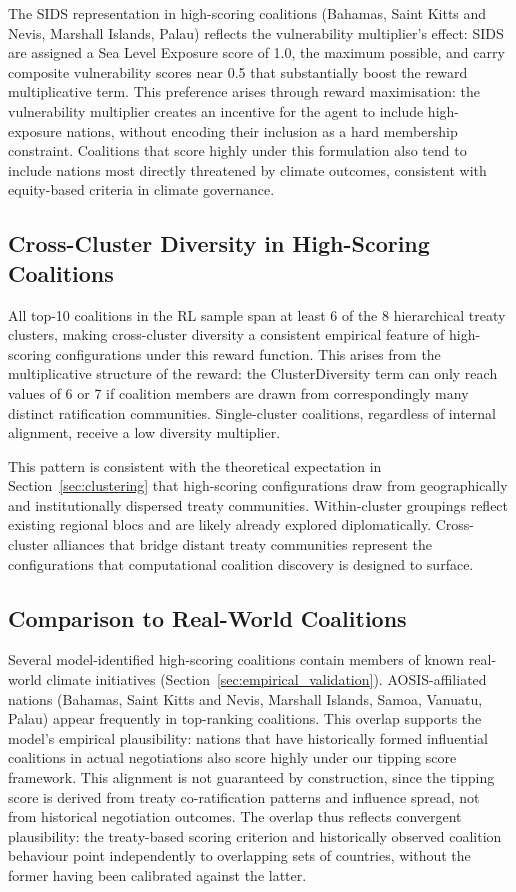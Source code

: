 \documentclass[11pt]{article}
\begin{document}
The SIDS representation in high-scoring coalitions (Bahamas, Saint Kitts and Nevis, Marshall Islands, Palau) reflects the vulnerability multiplier's effect: SIDS are assigned a Sea Level Exposure score of 1.0, the maximum possible, and carry composite vulnerability scores near 0.5 that substantially boost the reward multiplicative term. This preference arises through reward maximisation: the vulnerability multiplier creates an incentive for the agent to include high-exposure nations, without encoding their inclusion as a hard membership constraint. Coalitions that score highly under this formulation also tend to include nations most directly threatened by climate outcomes, consistent with equity-based criteria in climate governance.

\subsection*{Cross-Cluster Diversity in High-Scoring Coalitions}

All top-10 coalitions in the RL sample span at least 6 of the 8 hierarchical treaty clusters, making cross-cluster diversity a consistent empirical feature of high-scoring configurations under this reward function. This arises from the multiplicative structure of the reward: the ClusterDiversity term can only reach values of 6 or 7 if coalition members are drawn from correspondingly many distinct ratification communities. Single-cluster coalitions, regardless of internal alignment, receive a low diversity multiplier.

This pattern is consistent with the theoretical expectation in Section~\ref{sec:clustering} that high-scoring configurations draw from geographically and institutionally dispersed treaty communities. Within-cluster groupings reflect existing regional blocs and are likely already explored diplomatically. Cross-cluster alliances that bridge distant treaty communities represent the configurations that computational coalition discovery is designed to surface.

\subsection*{Comparison to Real-World Coalitions}

Several model-identified high-scoring coalitions contain members of known real-world climate initiatives (Section~\ref{sec:empirical_validation}). AOSIS-affiliated nations (Bahamas, Saint Kitts and Nevis, Marshall Islands, Samoa, Vanuatu, Palau) appear frequently in top-ranking coalitions. This overlap supports the model's empirical plausibility: nations that have historically formed influential coalitions in actual negotiations also score highly under our tipping score framework. This alignment is not guaranteed by construction, since the tipping score is derived from treaty co-ratification patterns and influence spread, not from historical negotiation outcomes. The overlap thus reflects convergent plausibility: the treaty-based scoring criterion and historically observed coalition behaviour point independently to overlapping sets of countries, without the former having been calibrated against the latter.
\end{document}
